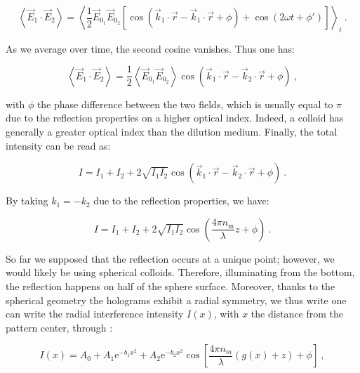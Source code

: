 \begin{equation}
	\left\langle  
	\vec{E}_1 \cdot \vec{E}_2\right\rangle = 
	\left\langle
	\frac{1}{2} \vec{E}_{0_1}  \vec{E}_{0_2} 
	\left[
	\cos 
	\left(
	\vec{k}_1 \cdot \vec{r} - \vec{k}_1 \cdot \vec{r} + \phi 
	\right) 
	+ 
	\cos
	\left(
	2\omega t + \phi'
	\right)
	\right]
	\right\rangle_t~.
\end{equation}

As we average over time, the second cosine vanishes. Thus one has:

\begin{equation}
	\left\langle \vec{E}_1 \cdot \vec{E}_2 \right\rangle = \frac{1}{2} \left\langle  \vec{E}_{0_1}  \vec{E}_{0_2}\right\rangle
	\cos 
	\left(
	\vec{k}_1 \cdot \vec{r} - \vec{k}_2 \cdot \vec{r} + \phi 
	\right)  ~,
\end{equation}

with $\phi$ the phase difference between the two fields, which is usually equal to $\pi$ due to the reflection properties on a higher optical index. Indeed, a colloid has generally a greater optical index than the dilution medium.  Finally, the total intensity can be read as:


\begin{equation}
	I = I_1 + I_2 + 2 \sqrt{I_1 I_2} 
	\cos 
	\left(
	\vec{k}_1 \cdot \vec{r} - \vec{k}_2 \cdot \vec{r} + \phi 
	\right) ~.
\end{equation}

By taking $k_1 = - k_2$ due to the reflection properties, we have:


\begin{equation}
	I = I_1 + I_2 + 2 \sqrt{I_1 I_2} 
	\cos 
	\left(
	\frac{4 \pi n_{\mathrm{m}}}{\lambda} z + \phi 
	\right) ~.
\end{equation}


So far we supposed that the reflection occurs at a unique point; however, we would likely be using spherical colloids. Therefore, illuminating from the bottom, the reflection happens on half of the sphere surface. Moreover, thanks to the spherical geometry the holograms exhibit a radial symmetry, we thus write one can write the radial interference intensity $I(x)$, with $x$ the distance from the pattern center, through \cite{ raedler_measurement_1992}:


\begin{equation}
	I(x) = A_0 + A_1 \mathrm{e}^{-b_1 x^2} + A_2\mathrm{e}^{-b_2 x^2} \cos \left[ \frac{4\pi n_m}{\lambda}\left( g(x) + z \right) + \phi \right] ~,
	\label{Eq.RICM}
\end{equation}


